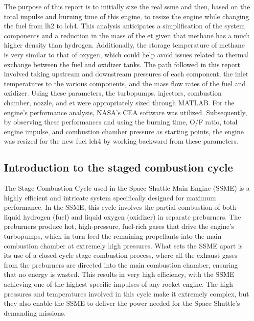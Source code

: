 
The purpose of this report is to initially size the real \acrfull{ssme} and then, based on the total impulse and burning time of this engine, to resize the engine while changing the fuel from \acrlong{lh2} to \acrfull{lch4}. 
This analysis anticipates a simplification of the system components and a reduction in the mass of the \acrfull{et} given that methane has a much higher density than hydrogen. Additionally, the storage temperature of methane is very similar to that of oxygen, which could help avoid issues related to thermal exchange between the fuel and oxidizer tanks.
The path followed in this report involved taking upstream and downstream pressures of each component, the inlet temperatures to the various components, and the mass flow rates of the fuel and oxidizer. Using these parameters, the turbopumps, injectors, combustion chamber, nozzle, and \acrlong{et} were appropriately sized through MATLAB. For the engine's performance analysis, NASA's CEA software was utilized. Subsequently, by observing these performances and using the burning time, O/F ratio, total engine impulse, and combustion chamber pressure as starting points, the engine was resized for the new fuel \acrshort{lch4} by working backward from these parameters.

\subsection{Introduction to the staged combustion cycle}
The Stage Combustion Cycle used in the Space Shuttle Main Engine (SSME) is a highly efficient and intricate system specifically designed for maximum performance.
In the SSME, this cycle involves the partial combustion of both liquid hydrogen (fuel) and liquid oxygen (oxidizer) in separate preburners. 
The preburners produce hot, high-pressure, fuel-rich gases that drive the engine's turbopumps, which in turn feed the remaining propellants into the main combustion chamber at extremely high pressures.
What sets the SSME apart is its use of a closed-cycle stage combustion process, where all the exhaust gases from the preburners are directed into the main combustion chamber, ensuring that no energy is wasted.
This results in very high efficiency, with the SSME achieving one of the highest specific impulses of any rocket engine.
The high pressures and temperatures involved in this cycle make it extremely complex, but they also enable the SSME to deliver the power needed for the Space Shuttle's demanding missions.


